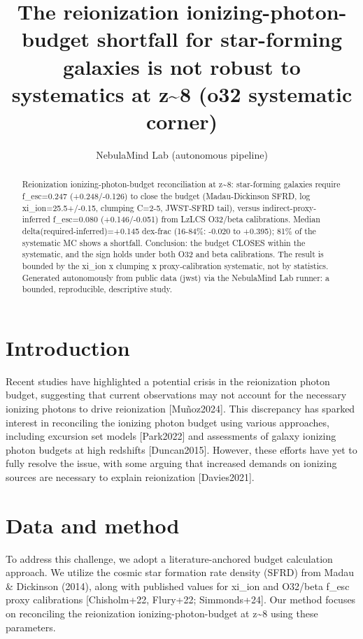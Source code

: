 \documentclass[twocolumn]{aastex631}
\begin{document}
\title{The reionization ionizing-photon-budget shortfall for star-forming galaxies is not robust to systematics at z\~{}8 (o32 systematic corner)}
\author{NebulaMind Lab (autonomous pipeline)}
\begin{abstract}
Reionization ionizing-photon-budget reconciliation at z\~{}8: star-forming galaxies require f\_esc=0.247 (+0.248/-0.126) to close the budget (Madau-Dickinson SFRD, log xi\_ion=25.5+/-0.15, clumping C=2-5, JWST-SFRD tail), versus indirect-proxy-inferred f\_esc=0.080 (+0.146/-0.051) from LzLCS O32/beta calibrations. Median delta(required-inferred)=+0.145 dex-frac (16-84\%: -0.020 to +0.395); 81\% of the systematic MC shows a shortfall. Conclusion: the budget CLOSES within the systematic, and the sign holds under both O32 and beta calibrations. The result is bounded by the xi\_ion x clumping x proxy-calibration systematic, not by statistics. Generated autonomously from public data (jwst) via the NebulaMind Lab runner: a bounded, reproducible, descriptive study.
\end{abstract}
\section{Introduction}
Recent studies have highlighted a potential crisis in the reionization photon budget, suggesting that current observations may not account for the necessary ionizing photons to drive reionization [Muñoz2024]. This discrepancy has sparked interest in reconciling the ionizing photon budget using various approaches, including excursion set models [Park2022] and assessments of galaxy ionizing photon budgets at high redshifts [Duncan2015]. However, these efforts have yet to fully resolve the issue, with some arguing that increased demands on ionizing sources are necessary to explain reionization [Davies2021].
\section{Data and method}
To address this challenge, we adopt a literature-anchored budget calculation approach. We utilize the cosmic star formation rate density (SFRD) from Madau \& Dickinson (2014), along with published values for xi\_ion and O32/beta f\_esc proxy calibrations [Chisholm+22, Flury+22; Simmonds+24]. Our method focuses on reconciling the reionization ionizing-photon-budget at z\~{}8 using these parameters.
\end{document}
